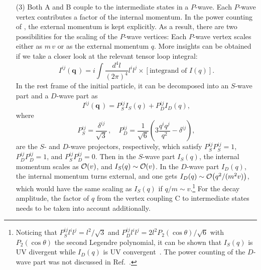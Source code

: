 \begin{itemize}
  \item[(3)] Both A and B couple to the intermediate states in a $P$-wave. Each 
$P$-wave vertex contributes a factor of the internal momentum. In the power 
counting of \nreft, the external momentum is kept explicitly. As a result, 
there are two possibilities for the scaling of the $P$-wave vertices: Each 
$P$-wave vertex scales either as $m\,v$ or as the external momentum $q$. More 
insights can be obtained if we take a closer look at the relevant tensor loop 
integral:
\begin{equation}
  I^{ij}(\bm q\,) =  i\int\!\frac{d^4l}{(2\pi)^4} l^il^j\times 
\left[\text{integrand of }I(q)\right].
\end{equation}
In the rest frame of the initial particle, it can be decomposed into an 
$S$-wave part and a $D$-wave part as
\begin{equation}
  I^{ij}(\bm q\,) = P_S^{ij} I_S(q) + P_D^{ij} I_D(q),
\end{equation}
where 
\begin{equation}
  P_S^{ij}=\frac{\delta^{ij}}{\sqrt{3} }\,,\quad  
  P_D^{ij}= \frac1{\sqrt{6}} \left( 3\frac{q^iq^j}{q^2} -\delta^{ij} \right), 
\end{equation}
are the $S$- and $D$-wave projectors, respectively, which satisfy 
$P_S^{ij}P_S^{ij} = 1$, $P_D^{ij}P_D^{ij} = 1$, and $P_S^{ij}P_D^{ij} = 0$. 
Then in the $S$-wave part $I_S(q)$, the internal momentum scales as 
$\mathcal{O}\!\left(v\right)\!\,$, and $I_S(q)\sim\mathcal{O}\!\left(v\right)\!\,$. In the $D$-wave part $I_D(q)$, the 
internal momentum turns external, and one gets $I_D(q)\sim\mathcal{O}\!\left(q^2/(m^2 
v)\right)\!\,$, which would have the same scaling as $I_S(q)$ if 
$q/m\sim v$.\footnote{Noticing that $P_S^{ij} l^il^j=l^2/\sqrt{3}$ and 
$P_D^{ij} 
l^il^j=2l^2 P_2(\cos\theta)/\sqrt{6}$ with $P_2(\cos\theta)$ the second 
Legendre polynomial, it can be shown that $I_S(q)$ is UV divergent while 
$I_D(q)$ is UV convergent~\cite{Albaladejo:2015dsa,Shen:2016tzq}. The power 
counting of the $D$-wave part was not discussed in Ref.~\cite{Guo:2010ak}.} For 
the 
decay amplitude, the factor of $q$ from the vertex coupling C to intermediate 
states needs to be taken into account additionally.
 
\end{itemize}



